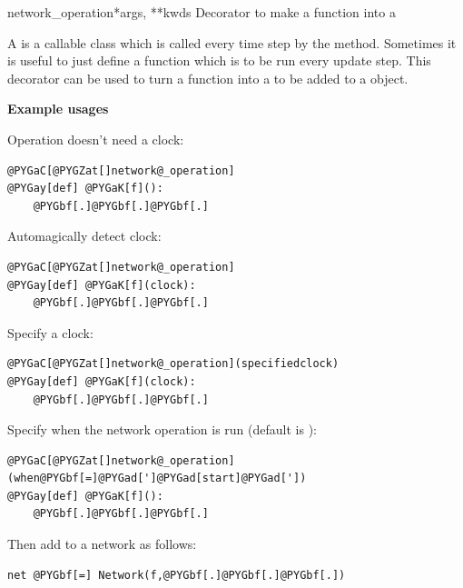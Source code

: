 \documentclass[letterpaper,10pt,english]{manual}
\begin{document}
\hypertarget{brian.network_operation}{}\begin{funcdesc}{network\_operation}{*args, **kwds}
Decorator to make a function into a \hyperlink{brian.NetworkOperation}{}

A \hyperlink{brian.NetworkOperation}{} is a callable class which is called every
time step by the \hyperlink{brian.Network}{}  method. Sometimes it is useful
to just define a function which is to be run every update step. This
decorator can be used to turn a function into a \hyperlink{brian.NetworkOperation}{}
to be added to a \hyperlink{brian.Network}{} object.

\textbf{Example usages}

Operation doesn't need a clock:

\begin{Verbatim}[commandchars=@\[\]]
@PYGaC[@PYGZat[]network@_operation]
@PYGay[def] @PYGaK[f]():
    @PYGbf[.]@PYGbf[.]@PYGbf[.]
\end{Verbatim}

Automagically detect clock:

\begin{Verbatim}[commandchars=@\[\]]
@PYGaC[@PYGZat[]network@_operation]
@PYGay[def] @PYGaK[f](clock):
    @PYGbf[.]@PYGbf[.]@PYGbf[.]
\end{Verbatim}

Specify a clock:

\begin{Verbatim}[commandchars=@\[\]]
@PYGaC[@PYGZat[]network@_operation](specifiedclock)
@PYGay[def] @PYGaK[f](clock):
    @PYGbf[.]@PYGbf[.]@PYGbf[.]
\end{Verbatim}

Specify when the network operation is run (default is ):

\begin{Verbatim}[commandchars=@\[\]]
@PYGaC[@PYGZat[]network@_operation](when@PYGbf[=]@PYGad[']@PYGad[start]@PYGad['])
@PYGay[def] @PYGaK[f]():
    @PYGbf[.]@PYGbf[.]@PYGbf[.]
\end{Verbatim}

Then add to a network as follows:

\begin{Verbatim}[commandchars=@\[\]]
net @PYGbf[=] Network(f,@PYGbf[.]@PYGbf[.]@PYGbf[.])
\end{Verbatim}
\end{funcdesc}
\end{document}
